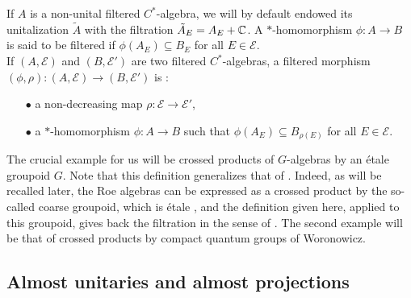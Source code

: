 If $A$ is a non-unital filtered $C^*$-algebra, we will by default endowed its unitalization $\tilde A$ with the filtration $\tilde A_E = A_E + \mathbb C$. A $*$-homomorphism $\phi : A \rightarrow B$ is said to be filtered if $\phi(A_E)\subseteq B_E$ for all $E\in\mathcal E$.\\

If $(A,\mathcal E)$ and $(B,\mathcal E')$ are two filtered $C^*$-algebras, a filtered morphism $(\phi,\rho): (A,\mathcal E)\rightarrow (B,\mathcal E')$ is :
\begin{itemize}
\item[$\bullet$] a non-decreasing map $\rho : \mathcal E\rightarrow \mathcal E'$,
\item[$\bullet$] a $*$-homomorphism $\phi: A\rightarrow B$ such that $\phi (A_E)\subseteq B_{\rho(E)}$ for all $E\in\mathcal E$.
\end{itemize}

The crucial example for us will be crossed products of $G$-algebras by an étale groupoid $G$. Note that this definition generalizes that of \cite{OY2}. Indeed, as will be recalled later, the Roe algebras can be expressed as a crossed product by the so-called coarse groupoid, which is étale \cite{SkTuYu}, and the definition given here, applied to this groupoid, gives back the filtration in the sense of \cite{OY2}. The second example will be that of crossed products by compact quantum groups of Woronowicz.\cite{Wo}

\subsection{Almost unitaries and almost projections}

